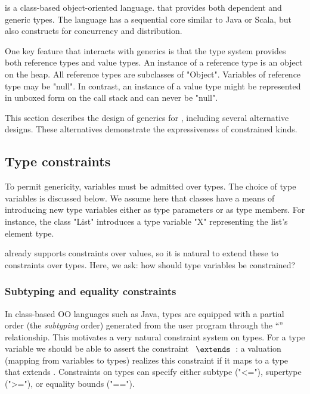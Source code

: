 \Xten{} is a class-based object-oriented language.
that provides both dependent and generic types.
The language has a sequential core similar to Java or Scala, but
also
constructs for concurrency and distribution.

One key feature that interacts with generics is that the type
system provides both reference types and value types.
An instance of a reference type is an object on the
heap.  All reference types are subclasses of \xcd"Object".
Variables of reference type may be \xcd"null".
In contrast, an instance of a value type might be represented in
unboxed form on the call stack
and can never be \xcd"null".

This section describes the design of generics for \Xten,
including several alternative designs.  These alternatives
demonstrate the expressiveness of constrained kinds.


\subsection{Type constraints}

To permit genericity, variables  must be admitted over types.
The choice of type variables is discussed below.  We assume here
that classes have a means of introducing new type variables
either as type parameters or as type members.
For instance,
the class \xcd"List" introduces a type variable \xcd"X"
representing the list's element type.

\Xten already supports constraints over values, so it is natural
to extend these to constraints over types.
Here, we ask: how should type variables be constrained?

\subsubsection{Subtyping and equality constraints}

In class-based OO languages such as Java,
types are equipped with a partial
order (the \emph{subtyping} order) generated from the user program
through the ``'' relationship.  
This motivates a very natural constraint system on types.  For a type
variable  we should be able to assert the constraint
~$\extends$~: a valuation (mapping from variables to types) realizes
this constraint if it maps  to a type that extends .
Constraints on types can specify either subtype (\xcd"<="),
supertype (\xcd">="), or equality bounds (\xcd"==").

